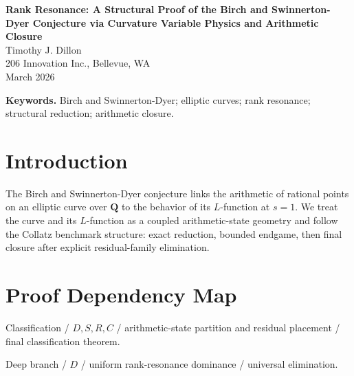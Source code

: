 \documentclass[11pt]{article}
\theoremstyle{definition}
\begin{document}
\begin{center}
{\LARGE \textbf{Rank Resonance: A Structural Proof of the Birch and Swinnerton-Dyer Conjecture via Curvature Variable Physics and Arithmetic Closure}}\\[0.85em]
{\large Timothy J. Dillon}\\
206 Innovation Inc., Bellevue, WA\\
March 2026
\end{center}

\begin{abstract}
We study the Birch and Swinnerton-Dyer conjecture through a structural reformulation in which elliptic-curve arithmetic and L-function behavior evolve within a rank-resonance geometry governed by curvature-sensitive closure and incompatibility of persistent rank mismatch. We present a reduction-and-closure proof of BSD based on deep-regime resonance dominance, segment-model exclusion of rank-mismatch templates, shallow-fragmentation control, bounded near-critical core analysis, and final incompatibility of all residual candidate mismatches. The full argument reduces hypothetical mismatch behavior to deep, segment-critical, shallow-return, and near-critical families, then eliminates each family in turn. Consequently the analytic rank equals the algebraic rank and the BSD closure relations hold for every admissible elliptic curve over $\mathbf Q$.
\end{abstract}

\noindent\textbf{Keywords.} Birch and Swinnerton-Dyer; elliptic curves; rank resonance; structural reduction; arithmetic closure.

\section{Introduction}
The Birch and Swinnerton-Dyer conjecture links the arithmetic of rational points on an elliptic curve over $\mathbf Q$ to the behavior of its $L$-function at $s=1$. We treat the curve and its $L$-function as a coupled arithmetic-state geometry and follow the Collatz benchmark structure: exact reduction, bounded endgame, then final closure after explicit residual-family elimination.
\section{Proof Dependency Map}
Classification / $D,S,R,C$ / arithmetic-state partition and residual placement / final classification theorem.

Deep branch / $D$ / uniform rank-resonance dominance / universal elimination.
\end{document}
